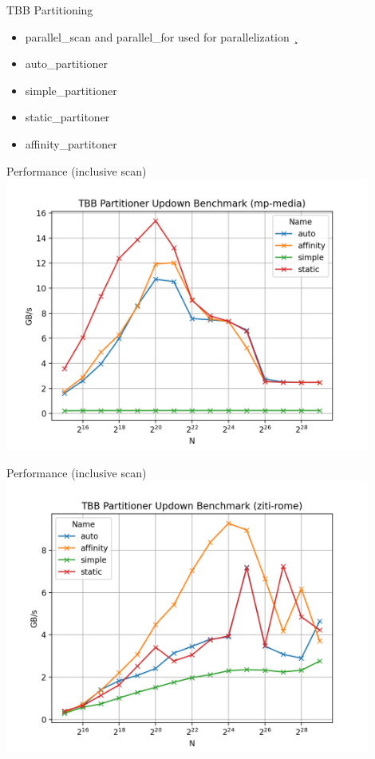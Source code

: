 \begin{frame}{TBB Partitioning} 
	\begin{itemize}
		\item parallel\_scan and parallel\_for used for parallelization
¸		\item auto\_partitioner
		\item simple\_partitioner
		\item static\_partitoner
		\item affinity\_partitoner
	\end{itemize}
\end{frame} 

\begin{frame}{Performance (inclusive scan)}
	\centering
	\vspace{-5pt}
	\includegraphics[width=0.90\textwidth]{"wiki/TBB Partitioner Updown Benchmark (mp-media).png"}
\end{frame}

\begin{frame}{Performance (inclusive scan)}
	\centering
	\vspace{-5pt}
	\includegraphics[width=0.90\textwidth]{"wiki/TBB Partitioner Updown Benchmark (ziti-rome).png"}
\end{frame}
